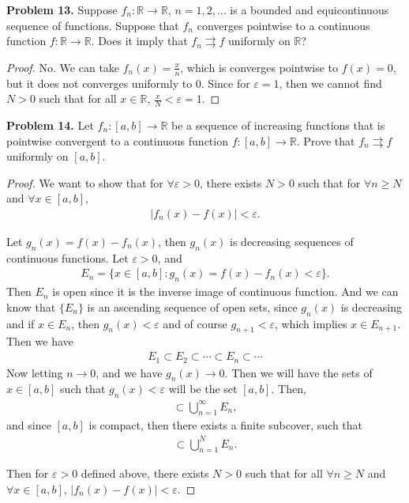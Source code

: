 \documentclass[12pt]{article}
\theoremstyle{definition}
\theoremstyle{definition}
\numberwithin{equation}{subsection}
\begin{document}
\medskip

\noindent
{\bf Problem 13.}
Suppose $f_n:\mathbb{R}\to\mathbb{R}$,
$n=1,2,\ldots$ is a bounded and equicontinuous sequence of functions.
Suppose that $f_n$ converges pointwise to a continuous
function $f:\mathbb{R}\to\mathbb{R}$.
Does it imply that
$f_n\rightrightarrows f$ uniformly on $\mathbb{R}$?
\begin{proof}
No. We can take $f_n(x) = \frac{x}{n}$, which is converges pointwise to $f(x) = 0$, but it does not converges uniformly to $0$. Since for $\varepsilon = 1$, then we cannot find $N > 0$ such that for all $x\in\mathbb{R}$, $\frac{x}{N} < \varepsilon = 1$. 
\end{proof}

\medskip

\noindent
{\bf Problem 14.}
Let $f_n:[a,b]\to\mathbb{R}$ be a sequence
of increasing functions that is pointwise convergent to a
continuous function $f:[a,b]\to\mathbb{R}$. Prove that
$f_n\rightrightarrows f$ uniformly on $[a,b]$.
\begin{proof}
We want to show that for $\forall \varepsilon > 0$, there exists $N > 0$ such that for $\forall n \geq N$ and $\forall x\in [a,b]$, 
\begin{align*}
    |f_n(x) - f(x)| < \varepsilon.
\end{align*}

Let $g_n(x) = f(x) - f_n(x)$, then $g_n(x)$ is decreasing sequences of continuous functions. Let $\varepsilon > 0$, and 
\begin{align*}
    E_n = \{x\in [a,b]: g_n(x) = f(x) - f_n(x) < \varepsilon\}.
\end{align*}
Then $E_n$ is open since it is the inverse image of continuous function. And we can know that $\{E_n\}$ is an ascending sequence of open sets, since $g_n(x)$ is decreasing and if $x\in E_n$, then $g_n(x) < \varepsilon$ and of course $g_{n+1} < \varepsilon$, which implies $x\in E_{n+1}$. Then we have
\begin{align*}
    E_1\subset E_2\subset \cdots \subset E_n \subset \cdots 
\end{align*}
Now letting $n\to 0$, and we have $g_n(x)\to 0$. Then we will have the sets of $x\in [a,b]$ such that $g_n(x) < \varepsilon$ will be the set $[a,b]$. Then,
\begin{align*}
    [a,b] \subset \bigcup^\infty_{n=1} E_n,
\end{align*}
and since $[a,b]$ is compact, then there exists a finite subcover, such that 
\begin{align*}
    [a,b] \subset \bigcup^N_{n=1} E_n.
\end{align*}

Then for $\varepsilon > 0$ defined above, there exists $N > 0$ such that for all $\forall n \geq N$ and $\forall x\in [a,b]$, $|f_n(x) - f(x)| < \varepsilon$.
\end{proof}
\end{document}
